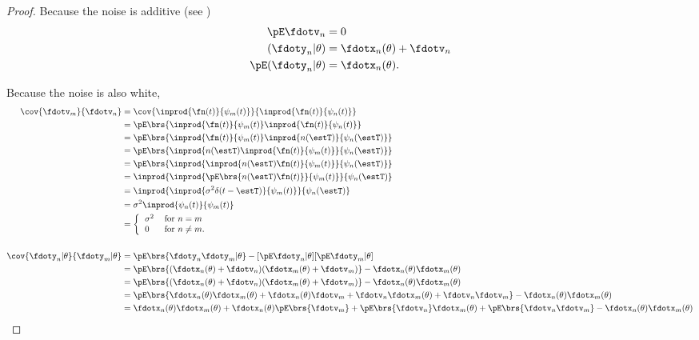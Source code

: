\begin{proof}
Because the noise is additive (see )
\begin{align*}
   \pE\fdotv_{n}           &= 0  \\
   (\fdoty_n |\theta)      &= \fdotx_n(\theta)  + \fdotv_n \\
   \pE({\fdoty_n} | \theta) &= \fdotx_n(\theta).
\end{align*}

Because the noise is also white,
\begin{align*}
   \cov{\fdotv_m}{\fdotv_n}
      &= \cov{\inprod{\fn(t)}{\psi_m(t)}}{\inprod{\fn(t)}{\psi_n(t)}}
    \\&= \pE\brs{\inprod{\fn(t)}{\psi_m(t)} \inprod{\fn(t)}{\psi_n(t)}}
    \\&= \pE\brs{\inprod{\fn(t)}{\psi_m(t)} \inprod{n(\estT)}{\psi_n(\estT)}}
    \\&= \pE\brs{ \inprod{n(\estT)\inprod{\fn(t)}{\psi_m(t)}}{\psi_n(\estT)}}
    \\&= \pE\brs{ \inprod{\inprod{n(\estT)\fn(t)}{\psi_m(t)}}{\psi_n(\estT)}}
    \\&= \inprod{\inprod{\pE\brs{ n(\estT)\fn(t)}}{\psi_m(t)}}{\psi_n(\estT)}
    \\&= \inprod{\inprod{\sigma^2 \delta(t-\estT)}{\psi_m(t)}}{\psi_n(\estT)}
    \\&= \sigma^2 \inprod{\psi_n(t)}{\psi_m(t)}
    \\&= \left\{
          \begin{tabular}{ll}
             $\sigma^2$ & for $n=m$ \\
             $0$   & for $n\ne m$.
          \end{tabular}
          \right.
\\
\\
   \cov{\fdoty_n|\theta}{\fdoty_m|\theta }
      &= \pE\brs{\fdoty_n \fdoty_m |\theta} - [\pE\fdoty_n|\theta][\pE\fdoty_m|\theta ]
    \\&= \pE\brs{(\fdotx_n(\theta) +\fdotv_n)(\fdotx_m(\theta) +\fdotv_m)} - \fdotx_n(\theta) \fdotx_m(\theta)
    \\&= \pE\brs{(\fdotx_n(\theta) +\fdotv_n)(\fdotx_m(\theta) +\fdotv_m)} - \fdotx_n(\theta) \fdotx_m(\theta)
    \\&= \pE\brs{\fdotx_n(\theta) \fdotx_m(\theta) +\fdotx_n(\theta) \fdotv_m+ \fdotv_n\fdotx_m(\theta) +\fdotv_n\fdotv_m } - \fdotx_n(\theta) \fdotx_m(\theta)
    \\&= \fdotx_n(\theta) \fdotx_m(\theta) + \fdotx_n(\theta) \pE\brs{\fdotv_m}+ \pE\brs{\fdotv_n}\fdotx_m(\theta) +\pE\brs{\fdotv_n\fdotv_m}  - \fdotx_n(\theta) \fdotx_m(\theta)

\end{align*}
\end{proof}
